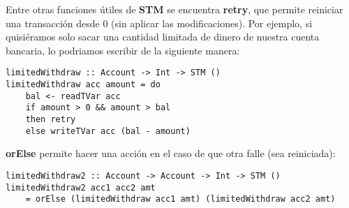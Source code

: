 Entre otras funciones útiles de \textbf{STM} se encuentra \textbf{retry}, que permite reiniciar una transacción desde 0 (sin aplicar las modificaciones). Por ejemplo, si quisiéramos solo sacar una cantidad limitada de dinero de nuestra cuenta bancaria, lo podriamos escribir de la siguiente manera:

\begin{lstlisting}
limitedWithdraw :: Account -> Int -> STM ()
limitedWithdraw acc amount = do
    bal <- readTVar acc
    if amount > 0 && amount > bal
    then retry
    else writeTVar acc (bal - amount)
\end{lstlisting}

\textbf{orElse} permite hacer una acción en el caso de que otra falle (sea reiniciada):

\begin{lstlisting}
limitedWithdraw2 :: Account -> Account -> Int -> STM ()
limitedWithdraw2 acc1 acc2 amt
    = orElse (limitedWithdraw acc1 amt) (limitedWithdraw acc2 amt)
\end{lstlisting}


